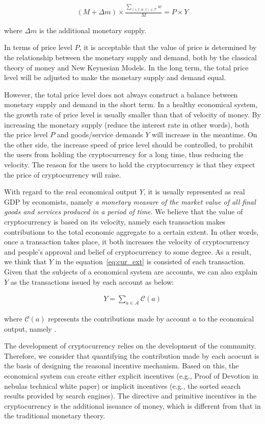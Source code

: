 \begin{align}
(M + \Delta{m}) \times \frac{\sum_{(s, t, w, \tau)\in \mathcal{T}}{w}}{M} = P \times Y
\label{eq:cur_ext}
\end{align}

\noindent where $\Delta{m}$ is the additional monetary supply. 

In terms of price level $P$, it is acceptable that the value of price is determined by the relationship between the monetary supply and demand, both by the classical theory of money and New Keynesian Models. In the long term, the total price level will be adjusted to make the monetary supply and demand equal.

However, the total price level does not always construct a balance between monetary supply and demand in the short term. In a healthy economical system, the growth rate of price level is usually smaller than that of velocity of money. By increasing the monetary supply (reduce the interest rate in other words), both the price level $P$ and goods/service demands $Y$ will increase in the meantime. On the other side, the increase speed of price level should be controlled, to prohibit the users from holding the cryptocurrency for a long time, thus reducing the velocity. The reason for the users to hold the cryptocurrency is that they expect the price of cryptocurrency will raise.


With regard to the real economical output $Y$, it is usually represented as real GDP by economists, namely \emph{a monetary measure of the market value of all final goods and services produced in a period of time}. We believe that the value of cryptocurrency is based on its velocity, namely each transaction makes contributions to the total economic aggregate to a certain extent. In other words, once a transaction takes place, it both increases the velocity of cryptocurrency and people's approval and belief of cryptocurrency to some degree. As a result, we think that $Y$ in the equation~\ref{eq:cur_ext} is consisted of each transaction. Given that the subjects of a economical system are accounts, we can also explain $Y$ as the transactions issued by each account as below:

\begin{align}
Y=\sum_{a\in \mathcal{A}} \mathcal{C}(a)
\end{align}

\noindent where $\mathcal{C}(a)$ represents the contributions made by account $a$ to the economical output, namely \nrcore.

The development of cryptocurrency relies on the development of the community. Therefore, we consider that quantifying the contribution made by each acocunt is the basis of designing the reasonal incentive mechanism. Based on this, the economical system can create either explicit incentives (e.g., Proof of Devotion in nebulas technical white paper) or implicit incentives (e.g., the sorted search results provided by search engines). 
The directive and primitive incentives in the cryptocurrency is the additional issuance of money, which is different from that in the traditional monetary theory.